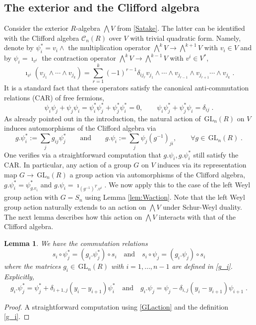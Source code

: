 \documentclass[12pt]{amsart}
\newcommand{\GL}{\,\mathrm{GL}}
\newcommand{\mc}[1]{\mathcal{#1}}
\newcommand{\ring}{R}
\newtheorem{lemma}[prop]{Lemma}
\numberwithin{equation}{section}
\numberwithin{figure}{section}
\begin{document}
\subsection{The exterior and the Clifford algebra} Consider the exterior $\ring$-algebra $\bigwedge V$ from \eqref{Satake}. The latter can be identified with the Clifford algebra $\mc{C}_n(\ring)$ over $V$ with trivial quadratic form. Namely, 
denote by $\psi_i^* = v_i\wedge$ the multiplication operator $\bigwedge^kV\to\bigwedge^{k+1}V$ with $v_i\in V$ and by $\psi_i = \imath_{v^i}$ the contraction operator $\bigwedge^kV\to\bigwedge^{k-1}V$ with $v^i\in V^*$,
\begin{equation}\label{contraction}
\imath_{v^i}(v_{j_1}\wedge\cdots\wedge v_{j_k})=\sum_{r=1}^k(-1)^{r-1}\delta_{ij_r}
v_{j_1}\wedge\cdots\wedge v_{j_{r-1}}\wedge v_{j_{r+1}}\cdots\wedge v_{j_k}\;.
\end{equation}
It is a standard fact that these operators satisfy the canonical anti-commutation relations (CAR) of free fermions,
\begin{equation}\label{CAR}
\psi_i\psi_j+\psi_j\psi_i=\psi_i^*\psi_j^*+\psi_j^*\psi_i^*=0,\qquad
\psi_i\psi^*_j+\psi_j^*\psi_i=\delta_{ij}\;.
\end{equation}
As already pointed out in the introduction, the natural action of $\GL_n(\ring)$ on $V$ induces automorphisms of the Clifford algebra via
\begin{equation}\label{GLaction}
g.\psi^*_i:=\sum_j g_{ij}\psi_j^*\qquad\text{and}\qquad g.\psi_i:=\sum_j\psi_j(g^{-1})_{ji},\qquad\forall g\in\GL_n(\ring)\;.
\end{equation}
One verifies via a straightforward computation that $g.\psi_i,g.\psi_i^*$ still satisfy the CAR. In particular, any action of a group $G$ on $V$ induces via its representation map $G\to \GL_n(\ring)$ a group action via automorphisms of the Clifford algebra, $g.\psi^*_i=\psi^*_{g.v_i}$ and $g.\psi_i=\imath_{(g^{-1})^T.v^i}$. We now apply this to the case of the left Weyl group action with $G=S_n$ using Lemma \ref{lem:Waction}. Note that the left Weyl group action naturally extends to an action on $\bigwedge V$ under Schur-Weyl duality. The next lemma describes how this action on $\bigwedge V$ interacts with that of the Clifford algebra.
\begin{lemma}\label{lem:WClifford}
    We have the commutation relations
    \[
    s_i\circ\psi^*_j=(g_i.\psi_j^*)\circ s_i
    \quad\text{and}\quad
    s_i\circ\psi_j=(g_i.\psi_j)\circ s_i
    \]
    where the matrices $g_i\in\GL_n(\ring)$ with $i=1,\ldots,n-1$ are defined in \eqref{g_i}. Explicitly,
    \[
    g_i.\psi^*_j=\psi^*_j+\delta_{i+1,j}(y_i-y_{i+1})\psi^*_{i}
    \quad\text{and}\quad
    g_i.\psi_j=\psi_j-\delta_{i,j}(y_i-y_{i+1})\psi_{i+1}\;.
    \]
\end{lemma}
\begin{proof}
    A straightforward computation using \eqref{GLaction} and the definition \eqref{g_i}.
\end{proof}
\end{document}
